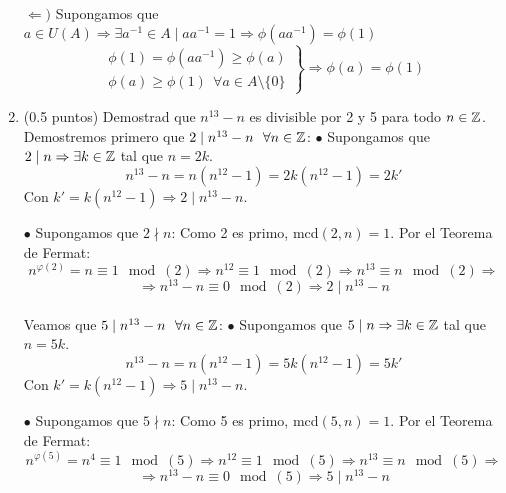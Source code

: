 \documentclass[12pt]{article}
\newcounter{ejercicio}[section] %
\newcounter{ejercicio}
\begin{document}
\begin{ejercicio}[4 puntos]
\begin{enumerate}
                \noindent
                $\Leftarrow)$ Supongamos que $a \in U(A) \Rightarrow \exists a^{-1} \in A \mid aa^{-1} = 1 \Rightarrow \phi(aa^{-1}) = \phi(1)$
                $$\left. \begin{array}{r}
                    \phi(1) = \phi(aa^{-1}) \geq \phi(a) \\
                    \phi(a) \geq \phi(1)~~\forall a \in A \setminus\{0\}
                \end{array}\right\}\Rightarrow \phi(a) = \phi(1)$$

            \item (0.5 puntos) Demostrad que $n^{13}-n$ es divisible por 2 y 5 para todo $n \in \mathbb{Z}$.\\

                \noindent
                Demostremos primero que $2 \mid n^{13}-n~~\forall n \in \mathbb{Z}$:\newline
                $\bullet$ Supongamos que $2 \mid n \Rightarrow \exists k \in \mathbb{Z}$ tal que $n = 2k$.
                $$n^{13}-n = n(n^{12}-1) = 2k(n^{12}-1)=2k'$$
                Con $k' = k(n^{12}-1) \Rightarrow 2 \mid n^{13}-n$.

                \noindent
                $\bullet$ Supongamos que $2 \nmid n$:\newline
                Como 2 es primo, mcd$(2,n) = 1$. Por el Teorema de Fermat:
                $$n^{\varphi(2)} = n \equiv 1 \mod (2) \Rightarrow n^{12} \equiv 1 \mod (2) \Rightarrow n^{13} \equiv n \mod (2) \Rightarrow$$
                $$\Rightarrow n^{13}-n \equiv 0 \mod (2) \Rightarrow 2 \mid n^{13}-n$$\\

                \noindent
                Veamos que $5 \mid n^{13}-n~~\forall n \in \mathbb{Z}$:\newline
                $\bullet$ Supongamos que $5 \mid n \Rightarrow \exists k \in \mathbb{Z}$ tal que $n = 5k$.
                $$n^{13}-n = n(n^{12}-1) = 5k(n^{12}-1)=5k'$$
                Con $k' = k(n^{12}-1) \Rightarrow 5 \mid n^{13}-n$.

                \noindent
                $\bullet$ Supongamos que $5 \nmid n$:\newline
                Como 5 es primo, mcd$(5,n) = 1$. Por el Teorema de Fermat:
                $$n^{\varphi(5)} = n^4 \equiv 1 \mod (5) \Rightarrow n^{12} \equiv 1 \mod (5) \Rightarrow n^{13} \equiv n \mod (5) \Rightarrow$$
                $$\Rightarrow n^{13}-n \equiv 0 \mod (5) \Rightarrow 5 \mid n^{13}-n$$



\end{enumerate}
\end{ejercicio}
\end{document}
